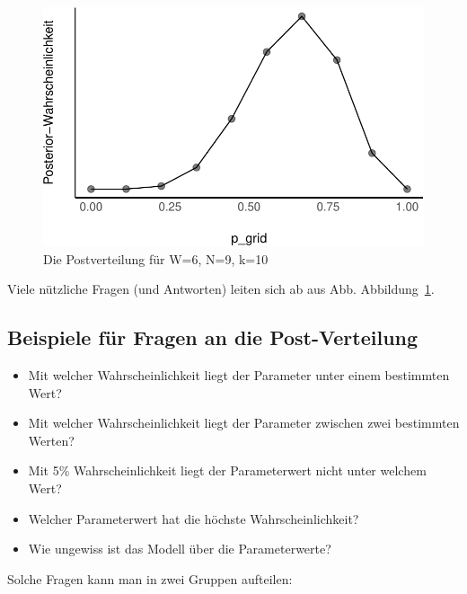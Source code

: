 \documentclass[
  a4paper,
  DIV=11]{scrreprt}
\providecommand{\tightlist}{%
  \setlength{\itemsep}{0pt}\setlength{\parskip}{0pt}}\usepackage{longtable,booktabs,array}
\theoremstyle{definition}
\theoremstyle{remark}
\begin{document}
\begin{figure}

{\centering \includegraphics{./Post_files/figure-pdf/fig-post1-1.pdf}

}

\caption{\label{fig-post1}Die Postverteilung für W=6, N=9, k=10}

\end{figure}

Viele nützliche Fragen (und Antworten) leiten sich ab aus Abb.
Abbildung~\ref{fig-post1}.

\hypertarget{beispiele-fuxfcr-fragen-an-die-post-verteilung}{%
\subsection{Beispiele für Fragen an die
Post-Verteilung}\label{beispiele-fuxfcr-fragen-an-die-post-verteilung}}

\begin{itemize}
\tightlist
\item
  Mit welcher Wahrscheinlichkeit liegt der Parameter unter einem
  bestimmten Wert?
\item
  Mit welcher Wahrscheinlichkeit liegt der Parameter zwischen zwei
  bestimmten Werten?
\item
  Mit 5\% Wahrscheinlichkeit liegt der Parameterwert nicht unter welchem
  Wert?
\item
  Welcher Parameterwert hat die höchste Wahrscheinlichkeit?
\item
  Wie ungewiss ist das Modell über die Parameterwerte?
\end{itemize}

Solche Fragen kann man in zwei Gruppen aufteilen:
\end{document}
